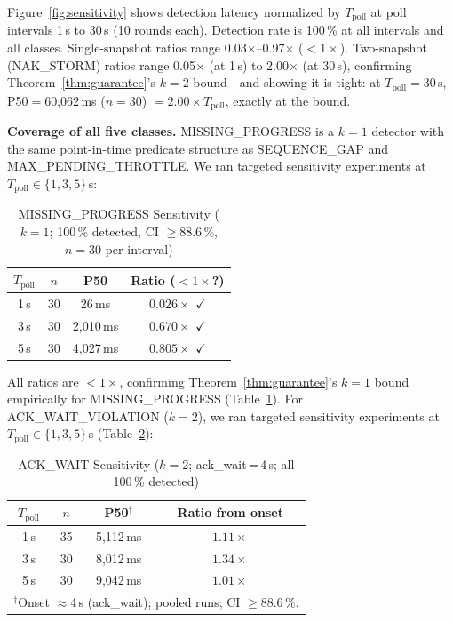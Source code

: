 \documentclass[journal]{IEEEtran}
\begin{document}
Figure~\ref{fig:sensitivity} shows detection latency normalized by
$T_\text{poll}$ at poll intervals 1\,s to 30\,s (10 rounds each).
Detection rate is 100\,\% at all intervals and all classes.
Single-snapshot ratios range 0.03$\times$--0.97$\times$ ($< 1\times$).
Two-snapshot (NAK\_STORM) ratios range 0.05$\times$ (at 1\,s) to
2.00$\times$ (at 30\,s), confirming Theorem~\ref{thm:guarantee}'s
$k{=}2$ bound---and showing it is tight: at $T_\text{poll}{=}30$\,s,
P50$=$60{,}062\,ms ($n{=}30$) $=2.00\times T_\text{poll}$, exactly at the bound.

\textbf{Coverage of all five classes.}
MISSING\_PROGRESS is a $k{=}1$ detector with the same point-in-time
predicate structure as SEQUENCE\_GAP and MAX\_PENDING\_THROTTLE.
We ran targeted sensitivity experiments at $T_\text{poll} \in \{1,3,5\}$\,s:

\begin{table}[t]
\centering
\caption{MISSING\_PROGRESS Sensitivity ($k{=}1$; 100\,\% detected, CI $\geq 88.6\,\%$, $n{=}30$ per interval)}
\label{tab:missing_sens}
\small\begin{tabular}{cccc}
\toprule
$T_\text{poll}$ & $n$ & P50 & Ratio ($< 1\times$?) \\
\midrule
1\,s & 30 &       26\,ms & $0.026\times$ $\checkmark$ \\
3\,s & 30 & 2{,}010\,ms  & $0.670\times$ $\checkmark$ \\
5\,s & 30 & 4{,}027\,ms  & $0.805\times$ $\checkmark$ \\
\bottomrule
\end{tabular}
\end{table}

All ratios are $<1\times$, confirming Theorem~\ref{thm:guarantee}'s
$k{=}1$ bound empirically for MISSING\_PROGRESS
(Table~\ref{tab:missing_sens}).
For ACK\_WAIT\_VIOLATION ($k{=}2$), we ran targeted sensitivity
experiments at $T_\text{poll} \in \{1,3,5\}$\,s
(Table~\ref{tab:ackwait_sens}):

\begin{table}[t]
\centering
\caption{ACK\_WAIT Sensitivity ($k{=}2$; ack\_wait\,=\,4\,s; all 100\,\% detected)}
\label{tab:ackwait_sens}
\small\begin{tabular}{cccc}
\toprule
$T_\text{poll}$ & $n$ & P50$^\dagger$ & Ratio from onset \\
\midrule
1\,s & 35 & 5{,}112\,ms & $1.11\times$ \\
3\,s & 30 & 8{,}012\,ms & $1.34\times$ \\
5\,s & 30 & 9{,}042\,ms & $1.01\times$ \\
\multicolumn{4}{l}{\small $^\dagger$Onset $\approx$4\,s (ack\_wait); pooled runs; CI $\geq 88.6\,\%$.} \\
\bottomrule
\end{tabular}
\end{table}
\end{document}
